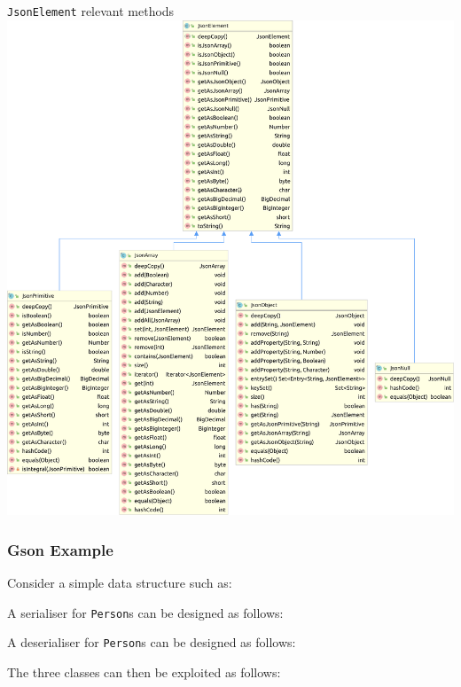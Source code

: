 \documentclass[presentation]{beamer}\mode<presentation>{\usetheme{AMSBolognaFC}}
\begin{document}
\begin{frame}[allowframebreaks]
    \begin{exampleblock}{\texttt{JsonElement} relevant methods}
        \centering
        \includegraphics[height=.7\textheight]{./figures/JsonElement.pdf}
    \end{exampleblock}

\end{frame}

\begin{frame}[allowframebreaks]
    \frametitle{Gson Example}

    Consider a simple data structure such as:
    

    \framebreak

    A serialiser for \texttt{Person}s can be designed as follows:
    

    \framebreak

    A deserialiser for \texttt{Person}s can be designed as follows:
    

    \framebreak

    The three classes can then be exploited as follows:
    

\end{frame}
\end{document}
